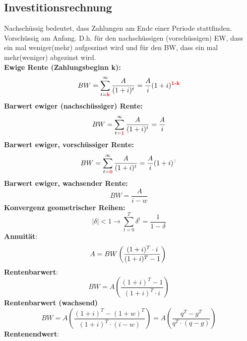 \documentclass[leqno]{scrartcl}
\begin{document}
\begin{multicols}{4}
\subsection{Investitionsrechnung}

Nachschüssig bedeutet, dass Zahlungen am Ende einer Periode
stattfinden. Vorschüssig am Anfang. D.h. für den nachschüssigen (vorschüssigen) EW, dass ein mal weniger(mehr) aufgeszinst wird und für 
den BW, dass ein mal mehr(weniger) abgezinst wird.\\
\textbf{Ewige Rente (Zahlungsbeginn k):}
  \begin{equation*}
    BW = \sum^{\infty}_{t=\color{red}{\textbf{k}}}\frac{A}{(1+i)^t}=\frac{A}{i}(1+i)^{\color{red}{\textbf{1-k}}}
  \end{equation*}
\textbf{Barwert ewiger (nachschüssiger) Rente:}
  \begin{equation*}
    BW = \sum^{\infty}_{t=\color{red}{\textbf{1}}}\frac{A}{(1+i)^t}=\frac{A}{i}
  \end{equation*}
\textbf{Barwert ewiger, vorschüssiger  Rente:}
  \begin{equation*}
    BW = \sum^{\infty}_{t=\color{red}{\textbf{0}}}\frac{A}{(1+i)^t}=\frac{A}{i}(1+i)^{\color{lightgray}{\textbf{1}}}
  \end{equation*}
\textbf{Barwert ewiger, wachsender Rente:}
  \begin{equation*}
    BW =\frac{A}{i-w}
  \end{equation*}
\textbf{Konvergenz geometrischer Reihen:}
  \begin{equation*}\label{convergence}
    |\delta|<1 \rightarrow \sum^T_{t=0}\delta^t=\frac{1}{1-\delta}
  \end{equation*}
\textbf{Annuität}:\\
  \begin{equation*}
    A = BW \left(\frac{(1+i)^T \cdot i}{(1+i)^T-1}\right)\\
  \end{equation*}
\textbf{Rentenbarwert}:\\
  \begin{equation*}
    BW = A  \left(\frac{(1+i)^T-1}{(1+i)^T \cdot i}\right)
  \end{equation*}
\textbf{Rentenbarwert (wachsend)}\\
  \begin{equation*}
    BW = A  \left(\frac{(1+i)^T-(1+w)^T}{(1+i)^T \cdot (i-w)}\right)= A  \left(\frac{q^T-g^T}{q^T \cdot (q-g)}\right)
  \end{equation*}
\textbf{Rentenendwert}:\\

\end{multicols}
\end{document}
